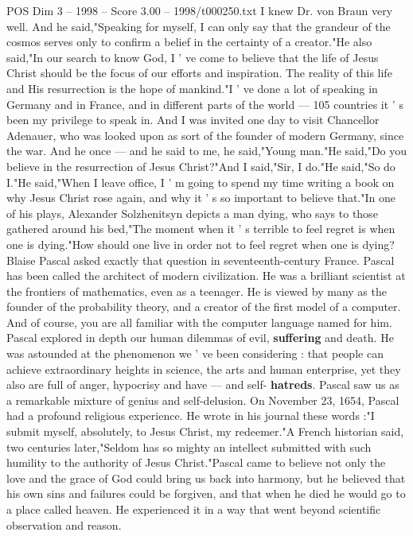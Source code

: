 \begin{textsample}{POS Dim 3 – 1998 – Score 3.00 – 1998/t000250.txt}
I knew Dr. von Braun very well.
And he said,"Speaking for myself, I can only say that the grandeur of the cosmos serves only to confirm a belief in the certainty of a creator."He also said,"In our search to know God, I ' ve come to believe that the life of Jesus Christ should be the focus of our efforts and inspiration.
The reality of this life and His resurrection is the hope of mankind."I ' ve done a lot of speaking in Germany and in France, and in different parts of the world — 105 countries it ' s been my privilege to speak in.
And I was invited one day to visit Chancellor Adenauer, who was looked upon as sort of the founder of modern Germany, since the war.
And he once — and he said to me, he said,"Young man."He said,"Do you believe in the resurrection of Jesus Christ?"And I said,"Sir, I do."He said,"So do I."He said,"When I leave office, I ' m going to spend my time writing a book on why Jesus Christ rose again, and why it ' s so important to believe that."In one of his plays, Alexander Solzhenitsyn depicts a man dying, who says to those gathered around his bed,"The moment when it ' s terrible to feel regret is when one is dying."How should one live in order not to feel regret when one is dying?
Blaise Pascal asked exactly that question in seventeenth-century France.
Pascal has been called the architect of modern civilization.
He was a brilliant scientist at the frontiers of mathematics, even as a teenager.
He is viewed by many as the founder of the probability theory, and a creator of the first model of a computer.
And of course, you are all familiar with the computer language named for him.
Pascal explored in depth our human dilemmas of evil, \textbf{suffering} and death.
He was astounded at the phenomenon we ' ve been considering : that people can achieve extraordinary heights in science, the arts and human enterprise, yet they also are full of anger, hypocrisy and have — and self- \textbf{hatreds}.
Pascal saw us as a remarkable mixture of genius and self-delusion.
On November 23, 1654, Pascal had a profound religious experience.
He wrote in his journal these words :"I submit myself, absolutely, to Jesus Christ, my redeemer."A French historian said, two centuries later,"Seldom has so mighty an intellect submitted with such humility to the authority of Jesus Christ."Pascal came to believe not only the love and the grace of God could bring us back into harmony, but he believed that his own sins and failures could be forgiven, and that when he died he would go to a place called heaven.
He experienced it in a way that went beyond scientific observation and reason.

\end{textsample}
